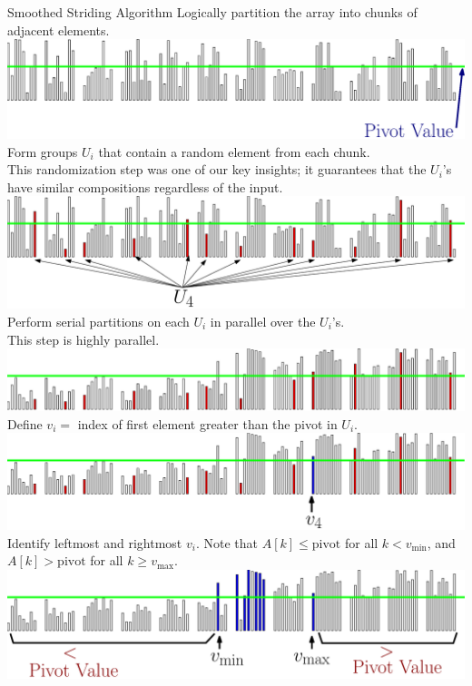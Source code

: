 \documentclass[table,serif,mathserif,final]{beamer}
\theoremstyle{remark}
\begin{document}
\begin{frame}{}
\begin{columns}[t]
\begin{column}{0.5\linewidth}
\begin{block}{\Huge Smoothed Striding Algorithm}
  \Huge
	Logically partition the array into chunks of adjacent elements.
	\includegraphics[width=\linewidth]{imgs/smoothedStridingAlgSim/sim1.eps}
	Form groups $U_i$ that contain a random element from each chunk. \\
  {\color{blue}This randomization step was one of our key insights; it guarantees that the $U_i$'s have similar compositions regardless of the input.}
	\includegraphics[width=\linewidth]{imgs/smoothedStridingAlgSim/sim2.eps}
	Perform serial partitions on each $U_i$ in parallel over the $U_i$'s. \\
  This step is highly parallel.
	\includegraphics[width=\linewidth]{imgs/smoothedStridingAlgSim/sim3.eps}
  Define $v_i = $ index of first element greater than the pivot in $U_i$. 
	\includegraphics[width=\linewidth]{imgs/smoothedStridingAlgSim/sim35.eps}
  Identify leftmost and rightmost $v_i$. Note that $A[k] \le \text{pivot}$ for all $k < v_{\min}$, and $A[k] > \text{pivot}$ for all $k \ge v_{\max}$.
	\includegraphics[width=\linewidth]{imgs/smoothedStridingAlgSim/sim4.eps}

\end{block}
\end{column}
\end{columns}
\end{frame}
\end{document}

